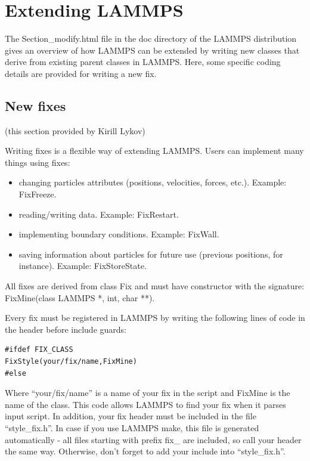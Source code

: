 \documentclass{article}
\begin{document}
\pagebreak
\section{Extending LAMMPS}

The Section\_modify.html file in the doc directory of
the LAMMPS distribution gives an overview of how LAMMPS can
be extended by writing new classes that derive from existing
parent classes in LAMMPS.  Here, some specific coding
details are provided for writing a new fix.

\subsection{New fixes}

(this section provided by Kirill Lykov)
\vspace{0.25cm}

Writing fixes is a flexible way of extending LAMMPS.  Users can
implement many things using fixes:

\begin{itemize}
\item changing particles attributes (positions, velocities, forces, etc.).
Example: FixFreeze.
\item reading/writing data. Example: FixRestart.
\item implementing boundary conditions. Example: FixWall.
\item saving information about particles for future use (previous positions,
for instance). Example: FixStoreState.
\end{itemize}

All fixes are derived from class Fix and must have constructor with the
signature: FixMine(class LAMMPS *, int, char **).

Every fix must be registered in LAMMPS by writing the following lines
of code in the header before include guards:

 \begin{center}
 \begin{verbatim}
#ifdef FIX_CLASS
FixStyle(your/fix/name,FixMine)
#else
  \end{verbatim}
 \end{center}

Where ``your/fix/name'' is a name of your fix in the script and FixMine
is the name of the class. This code allows LAMMPS to find your fix
when it parses input script. In addition, your fix header must be
included in the file ``style\_fix.h''. In case if you use LAMMPS make,
this file is generated automatically - all files starting with prefix
fix\_ are included, so call your header the same way. Otherwise, don't
forget to add your include into ``style\_fix.h''.
\end{document}

